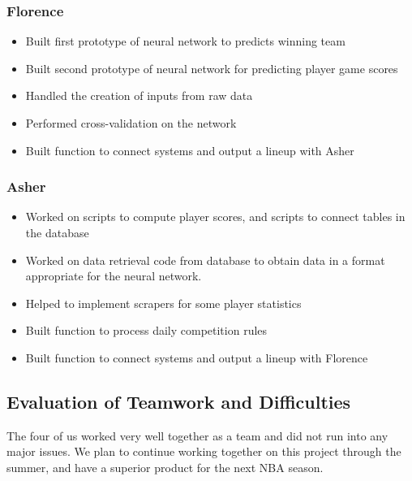 \subsubsection{Florence}
\begin{itemize}
  \item Built first prototype of neural network to predicts winning team
  \item Built second prototype of neural network for predicting player game scores
  \item Handled the creation of inputs from raw data
  \item Performed cross-validation on the network
  \item Built function to connect systems and output a lineup with Asher
\end{itemize}
\subsubsection{Asher}
\begin{itemize}
  \item Worked on scripts to compute player scores, and scripts to connect tables in the database
  \item Worked on data retrieval code from database to obtain data in a format appropriate for the neural network.
  \item Helped to implement scrapers for some player statistics
  \item Built function to process daily competition rules
  \item Built function to connect systems and output a lineup with Florence
\end{itemize}

\subsection{Evaluation of Teamwork and Difficulties}
The four of us worked very well together as a team and did not run into any major issues. We plan to continue working together on this project through the summer, and have a superior product for the next NBA season.